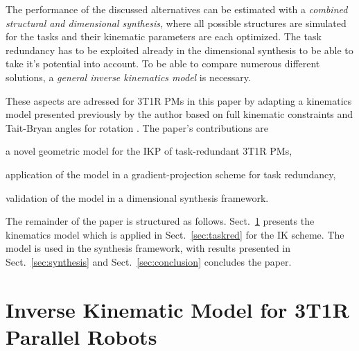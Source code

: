 \documentclass[
	graybox,
	vecphys] %
	{svmult}
\begin{document}
The performance of the discussed alternatives can be estimated with a \emph{combined structural and dimensional synthesis}, where all possible structures are simulated for the tasks and their kinematic parameters are each optimized. %
The task redundancy has to be exploited already in the dimensional synthesis to be able to take it's potential into account.
To be able to compare numerous different solutions, a \emph{general inverse kinematics model} is necessary.

These aspects are adressed for 3T1R PMs in this paper by adapting a kinematics model presented previously by the author based on full kinematic constraints and Tait-Bryan angles for rotation \cite{SchapplerTapOrt2019}.
%
The paper's contributions are
\begin{compactitem}
\item a novel geometric model for the IKP of task-redundant 3T1R PMs, 
\item application of the model in a gradient-projection scheme for task redundancy,
\item validation of the model in a dimensional synthesis framework.
\end{compactitem}

The remainder of the paper is structured as follows. Sect.~\ref{sec:model} presents the kinematics model which is applied in 
Sect.~\ref{sec:taskred} for the IK scheme.
The model is used in the synthesis framework, with results presented in Sect.~\ref{sec:synthesis} and 
Sect.~\ref{sec:conclusion} concludes the paper.


\section{Inverse Kinematic Model for 3T1R Parallel Robots}
\label{sec:model}
\end{document}
